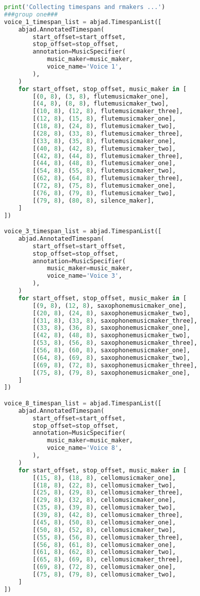 \begin{lstlisting}[language=Python, caption=Four Ages of Sand Segment\_I]
print('Collecting timespans and rmakers ...')
###group one###
voice_1_timespan_list = abjad.TimespanList([
    abjad.AnnotatedTimespan(
        start_offset=start_offset,
        stop_offset=stop_offset,
        annotation=MusicSpecifier(
            music_maker=music_maker,
            voice_name='Voice 1',
        ),
    )
    for start_offset, stop_offset, music_maker in [
        [(0, 8), (3, 8), flutemusicmaker_one],
        [(4, 8), (8, 8), flutemusicmaker_two],
        [(10, 8), (12, 8), flutemusicmaker_three],
        [(12, 8), (15, 8), flutemusicmaker_one],
        [(18, 8), (24, 8), flutemusicmaker_two],
        [(28, 8), (33, 8), flutemusicmaker_three],
        [(33, 8), (35, 8), flutemusicmaker_one],
        [(40, 8), (42, 8), flutemusicmaker_two],
        [(42, 8), (44, 8), flutemusicmaker_three],
        [(44, 8), (48, 8), flutemusicmaker_one],
        [(54, 8), (55, 8), flutemusicmaker_two],
        [(62, 8), (64, 8), flutemusicmaker_three],
        [(72, 8), (75, 8), flutemusicmaker_one],
        [(76, 8), (79, 8), flutemusicmaker_two],
        [(79, 8), (80, 8), silence_maker],
    ]
])

voice_3_timespan_list = abjad.TimespanList([
    abjad.AnnotatedTimespan(
        start_offset=start_offset,
        stop_offset=stop_offset,
        annotation=MusicSpecifier(
            music_maker=music_maker,
            voice_name='Voice 3',
        ),
    )
    for start_offset, stop_offset, music_maker in [
        [(9, 8), (12, 8), saxophonemusicmaker_one],
        [(20, 8), (24, 8), saxophonemusicmaker_two],
        [(31, 8), (33, 8), saxophonemusicmaker_three],
        [(33, 8), (36, 8), saxophonemusicmaker_one],
        [(42, 8), (48, 8), saxophonemusicmaker_two],
        [(53, 8), (56, 8), saxophonemusicmaker_three],
        [(56, 8), (60, 8), saxophonemusicmaker_one],
        [(64, 8), (69, 8), saxophonemusicmaker_two],
        [(69, 8), (72, 8), saxophonemusicmaker_three],
        [(75, 8), (79, 8), saxophonemusicmaker_one],
    ]
])

voice_8_timespan_list = abjad.TimespanList([
    abjad.AnnotatedTimespan(
        start_offset=start_offset,
        stop_offset=stop_offset,
        annotation=MusicSpecifier(
            music_maker=music_maker,
            voice_name='Voice 8',
        ),
    )
    for start_offset, stop_offset, music_maker in [
        [(15, 8), (18, 8), cellomusicmaker_one],
        [(18, 8), (22, 8), cellomusicmaker_two],
        [(25, 8), (29, 8), cellomusicmaker_three],
        [(29, 8), (32, 8), cellomusicmaker_one],
        [(35, 8), (39, 8), cellomusicmaker_two],
        [(39, 8), (42, 8), cellomusicmaker_three],
        [(45, 8), (50, 8), cellomusicmaker_one],
        [(50, 8), (52, 8), cellomusicmaker_two],
        [(55, 8), (56, 8), cellomusicmaker_three],
        [(56, 8), (61, 8), cellomusicmaker_one],
        [(61, 8), (62, 8), cellomusicmaker_two],
        [(65, 8), (69, 8), cellomusicmaker_three],
        [(69, 8), (72, 8), cellomusicmaker_one],
        [(75, 8), (79, 8), cellomusicmaker_two],
    ]
])


\end{lstlisting}
